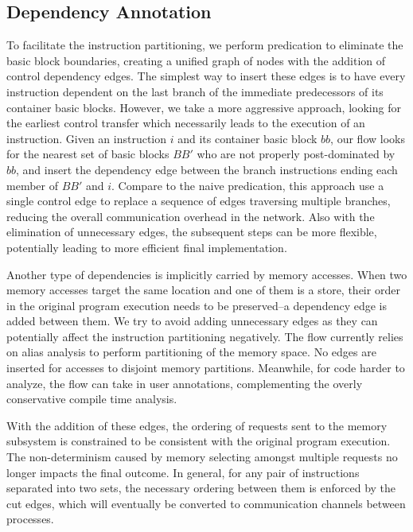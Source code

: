 \documentclass{sig-alternate}
\begin{document}
\subsection{Dependency Annotation}
\label{mainConvert:mem}
To facilitate the instruction partitioning, we perform predication to eliminate the basic block boundaries, creating a unified graph of nodes with the
addition of control dependency edges. 
The simplest way to insert these edges is to have every instruction dependent on the last branch of the immediate
predecessors of its container basic blocks. However, we take a more aggressive approach, looking for the earliest control transfer which necessarily leads to the execution of an instruction.
Given an instruction $i$ and its container basic block $bb$, our
flow looks for the nearest set of basic blocks $BB'$ who are not properly post-dominated by $bb$,
and insert the dependency edge between the branch instructions ending each member of $BB'$ and $i$. Compare to the naive predication, this approach use a single control edge to replace a sequence of edges traversing multiple branches, reducing the overall communication
overhead in the network. Also with the elimination of unnecessary edges, the subsequent steps can be more flexible, potentially leading to more efficient final implementation.

Another type of dependencies is implicitly carried by memory accesses. When
two memory accesses target the same location and one of
them is a store, their order in the original program execution
needs to be preserved--a dependency edge is added
between them. We try to avoid adding unnecessary edges as they
can potentially affect the instruction partitioning negatively. 
The flow currently relies on alias analysis to perform partitioning of the memory space. No edges are inserted for accesses to disjoint memory partitions. 
Meanwhile, for code harder to analyze, the flow can take in user annotations, complementing the overly conservative compile time analysis. 

With the addition of these edges, the ordering of requests sent to the memory
subsystem is constrained to be consistent with the original program execution.
The non-determinism caused by memory selecting amongst multiple requests no longer
impacts the final outcome. In general, for any pair of instructions separated into two sets, the necessary ordering between them is enforced by the cut edges,
which will eventually be converted to communication channels between processes.
\end{document}
